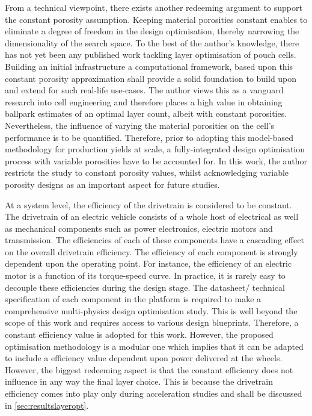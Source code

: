 From a technical  viewpoint, there exists another redeeming  argument to support
the constant  porosity assumption. Keeping material  porosities constant enables
to eliminate a  degree of freedom in the design  optimisation, thereby narrowing
the dimensionality of  the search space. To the best  of the author's knowledge,
there has not  yet been any published work tackling  layer optimisation of pouch
cells.  Building an  initial  infrastructure \viz{}  a computational  framework,
based upon this constant porosity approximation shall provide a solid foundation
to build upon and extend for such  real-life use-cases. The author views this as
a vanguard research  into cell engineering and therefore places  a high value in
obtaining ballpark  estimates of  an optimal layer  count, albeit  with constant
porosities. Nevertheless,  the influence of  varying the material  porosities on
the cell's  performance is to be  quantified. Therefore, prior to  adopting this
model-based  methodology  for production  yields  at  scale, a  fully-integrated
design optimisation process  with variable porosities have to  be accounted for.
In this work, the author restricts the study to constant porosity values, whilst
acknowledging  variable  porosity designs  as  an  important aspect  for  future
studies.

At  a  system level,  the  efficiency  of the  drivetrain  is  considered to  be
constant. The  drivetrain of  an electric  vehicle consists of  a whole  host of
electrical as well as mechanical  components such as power electronics, electric
motors and  transmission. The efficiencies  of each  of these components  have a
cascading effect  on the overall  drivetrain efficiency. The efficiency  of each
component  is strongly  dependent upon  the operating  point. For  instance, the
efficiency of  an electric  motor is  a function of  its torque-speed  curve. In
practice, it  is rarely easy  to decouple  these efficiencies during  the design
stage. The datasheet/ technical specification  of each component in the platform
is required  to make  a comprehensive  multi-physics design  optimisation study.
This is well beyond the scope of this work and requires access to various design
blueprints. Therefore,  a constant  efficiency value is  adopted for  this work.
However, the  proposed optimisation methodology  is a modular one  which implies
that it can be adapted \eg{} to  include a efficiency value dependent upon power
delivered  at the  wheels. However,  the biggest  redeeming aspect  is that  the
constant efficiency does  not influence in any way the  final layer choice. This
is because  the drivetrain efficiency  comes into play only  during acceleration
studies and shall be discussed in \cref{sec:resultslayeropt}.

